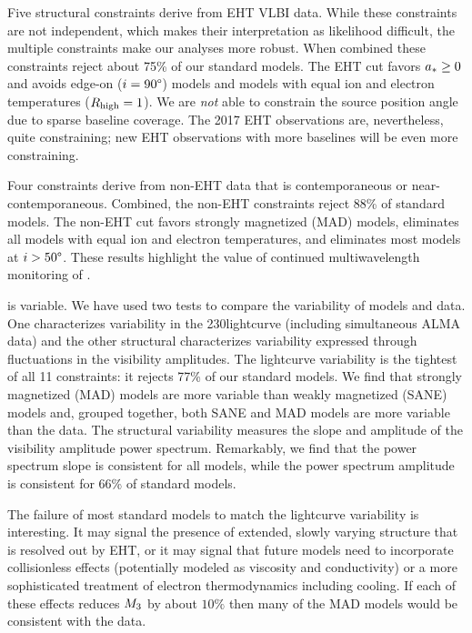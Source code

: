 Five structural constraints derive from EHT VLBI data.
While these constraints are not independent, which makes their interpretation as likelihood difficult, the multiple constraints make our analyses more robust.
When combined these constraints reject about 75\% of our standard models.  The EHT cut favors $a_* \ge 0$ and avoids edge-on ($i = 90\degree$) models and models with equal ion and electron temperatures ($R_\mathrm{high} = 1$).
We are {\em not} able to constrain the source position angle due to sparse baseline coverage.
The 2017 EHT observations are, nevertheless, quite constraining; new EHT observations with more baselines will be even more constraining.

Four constraints derive from non-EHT data that is contemporaneous or near-contemporaneous.  Combined, the non-EHT constraints reject 88\% of standard models.  The non-EHT cut favors strongly magnetized (MAD) models, eliminates all models with equal ion and electron temperatures, and eliminates most models at $i > 50\degree$.  These results highlight the value of continued multiwavelength monitoring of \sgra.

\sgra is variable.  We have used two tests to compare the variability of models and data. One characterizes variability in the 230\GHz lightcurve (including simultaneous ALMA data) and the other structural characterizes variability expressed through fluctuations in the visibility amplitudes.  The lightcurve variability is the tightest of all 11 constraints: it rejects 77\% of our standard models.  We find that strongly magnetized (MAD) models are more variable than weakly magnetized (SANE) models and, grouped together, both SANE and MAD models are more variable than the data.  The structural variability measures the slope and amplitude of the visibility amplitude power spectrum.  Remarkably, we find that the power spectrum slope is consistent for all models, while the power spectrum amplitude is consistent for 66\% of standard models.

The failure of most standard models to match the lightcurve variability is interesting.  It may signal the presence of extended, slowly varying structure that is resolved out by EHT, or it may signal that future models need to incorporate collisionless effects (potentially modeled as viscosity and conductivity) or a more sophisticated treatment of electron thermodynamics including cooling.  If each of these effects reduces $M_{3}$ by about $10\%$ then many of the MAD models would be consistent with the data.

